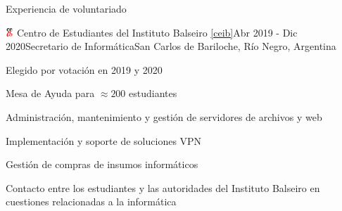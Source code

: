 \documentclass{resume} %
\begin{document}
\begin{rSection}{Experiencia de voluntariado}
    \begin{rSubsection}{\includegraphics[height=0.3cm]{images/ceib.png} Centro de Estudiantes del Instituto Balseiro \ref{ceib}}{Abr 2019 - Dic 2020}{Secretario de Informática}{San Carlos de Bariloche, Río Negro, Argentina}
        \item Elegido por votación en 2019 y 2020
        \item Mesa de Ayuda para $\approx 200$ estudiantes
        \item Administración, mantenimiento y gestión de servidores de archivos y web
        \item Implementación y soporte de soluciones VPN
        \item Gestión de compras de insumos informáticos
        \item Contacto entre los estudiantes y las autoridades del Instituto Balseiro en cuestiones relacionadas a la informática
    \end{rSubsection}


\end{rSection}

\end{document}
